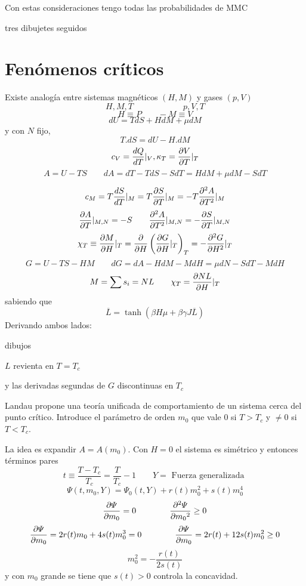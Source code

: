 \documentclass[10pt,oneside]{CBFT_book}
\begin{document}

Con estas consideraciones tengo todas las probabilidades de MMC

tres dibujetes seguidos

\section{Fenómenos críticos}

Existe analogía entre sistemas magnéticos $(H,M)$ y gases $(p,V)$
\[
	H,M,T	\qquad \qquad \qquad p,V,T
\]
\[
	H \equiv P \qquad -M \equiv V
\]
\[
	dU = TdS + HdM + \mu dM 
\]
y con $N$ fijo,
\[
	T.dS = dU - H.dM	
\]
\[
	c_V = \dtot{Q}{T}|_V, \kappa_T = \dpar{V}{T}|_T
\]
\[
	A = U - TS \qquad dA = dT - TdS - SdT = HdM + \mu dM - SdT
\]

\[
	c_M = T\dtot{S}{T}|_M = T \dpar{S}{T}|_M = -T\dpar[2]{A}{T}|_M 
\]
\[
	\dpar{A}{T}|_{M,N} = -S \qquad \dpar[2]{A}{T}|_{M,N} = -\dpar{S}{T}|_{M,N}
\]
\[
	\chi_T \equiv \dpar{M}{H}|_T = \dpar{}{H}\left(\dpar{G}{H}|_T\right)_T = - \dpar[2]{G}{H}|_T
\]
\[
	G = U - TS -HM \qquad dG = dA - HdM - MdH = \mu dN - SdT - M dH
\]
\[
	M = \sum s_i = NL \qquad \chi_T = \dpar{NL}{H}|_T
\]
sabiendo que 
\[
	\overline{L} = \tanh ( \beta H \mu + \beta \gamma J \overline{L} )
\]
Derivando ambos lados:

dibujos

$L$ revienta en $T=T_c$


y las derivadas segundas de $G$ discontinuas en $T_c$

Landau propone una teoría unificada de comportamiento de un sistema cerca del punto crítico.
Introduce el parámetro de orden $m_0$ que vale 0 si $T>T_c$ y $\neq 0$ si $T<T_c$.

La idea es expandir $ A = A(m_0) $.
Con $H=0$ el sistema es simétrico y entonces términos pares
\[
	t \equiv \frac{T-T_c}{T_c} = \frac{T}{T_c} -1  \qquad Y = \text{ Fuerza generalizada }
\]
\[
	\Psi( t, m_0,Y ) = \Psi_0( t, Y ) + r(t) m_0^2 + s(t) m_0^4
\]
\[	
	\dpar{\Psi}{m_0} = 0 \qquad  \qquad  \dpar[2]{\Psi}{m_0} \geq 0
\]
\[	
	\dpar{\Psi}{m_0} = 2 r(t) m_0 + 4 s(t) m_0^3 = 0 \qquad \qquad 
	\dpar{\Psi}{m_0} = 2 r(t) + 12 s(t) m_0^2 \geq 0
\]
\[	
	m_0^2 = -\frac{r(t)}{2s(t)}
\]
y con $m_0$ grande se tiene que $s(t)>0$ controla la concavidad.
\end{document}
